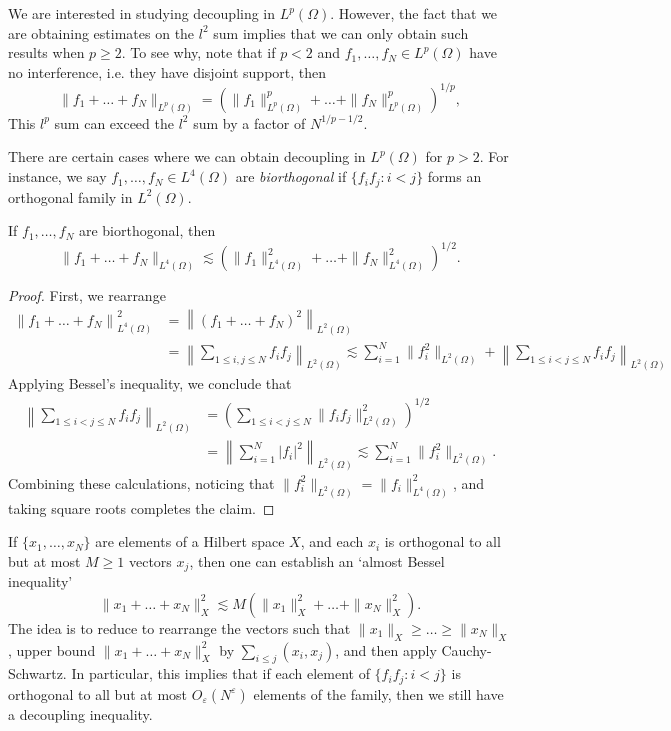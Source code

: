 \begin{remark}
  We are interested in studying decoupling in $L^p(\Omega)$. However, the fact that we are obtaining estimates on the $l^2$ sum implies that we can only obtain such results when $p \geq 2$. To see why, note that if $p < 2$ and $f_1, \dots, f_N \in L^p(\Omega)$ have no interference, i.e. they have disjoint support, then
  \[ \| f_1 + \dots + f_N \|_{L^p(\Omega)} = \left( \| f_1 \|_{L^p(\Omega)}^p + \dots + \| f_N \|_{L^p(\Omega)}^p  \right)^{1/p}, \]
  This $l^p$ sum can exceed the $l^2$ sum by a factor of $N^{1/p - 1/2}$.
\end{remark}

There are certain cases where we can obtain decoupling in $L^p(\Omega)$ for $p > 2$. For instance, we say $f_1, \dots, f_N \in L^4(\Omega)$ are \emph{biorthogonal} if $\{ f_i f_j : i < j \}$ forms an orthogonal family in $L^2(\Omega)$.

\begin{theorem}
  If $f_1, \dots, f_N$ are biorthogonal, then
  \[ \| f_1 + \dots + f_N \|_{L^4(\Omega)} \lesssim \left( \| f_1 \|_{L^4(\Omega)}^2 + \dots + \| f_N \|_{L^4(\Omega)}^2 \right)^{1/2}. \]
\end{theorem}
\begin{proof}
  First, we rearrange
  \begin{align*}
    \left\| f_1 + \dots + f_N \right\|_{L^4(\Omega)}^2 &= \left\| (f_1 + \dots + f_N)^2 \right\|_{L^2(\Omega)}\\
    &= \left\| \sum_{1 \leq i,j \leq N} f_i f_j \right\|_{L^2(\Omega)} \lesssim \sum_{i = 1}^N \| f_i^2 \|_{L^2(\Omega)} + \left\| \sum_{1 \leq i < j \leq N} f_i f_j \right\|_{L^2(\Omega)}
  \end{align*}
  Applying Bessel's inequality, we conclude that
  \begin{align*}
    \left\| \sum_{1 \leq i < j \leq N} f_i f_j \right\|_{L^2(\Omega)} &= \left( \sum_{1 \leq i < j \leq N} \| f_i f_j \|_{L^2(\Omega)}^2 \right)^{1/2}\\
    &= \left\| \sum_{i = 1}^N |f_i|^2 \right\|_{L^2(\Omega)} \lesssim \sum_{i = 1}^N \| f_i^2 \|_{L^2(\Omega)}.
  \end{align*}
  Combining these calculations, noticing that $\| f_i^2 \|_{L^2(\Omega)} = \| f_i \|_{L^4(\Omega)}^2$, and taking square roots completes the claim.
\end{proof}

\begin{remark}
  If $\{ x_1, \dots, x_N \}$ are elements of a Hilbert space $X$, and each $x_i$ is orthogonal to all but at most $M \geq 1$ vectors $x_j$, then one can establish an `almost Bessel inequality'
  \[ \| x_1 + \dots + x_N \|_X^2 \lesssim M \left( \| x_1 \|_X^2 + \dots + \| x_N \|_X^2 \right). \]
  The idea is to reduce to rearrange the vectors such that $\| x_1 \|_X \geq \dots \geq \| x_N \|_X$, upper bound $\| x_1 + \dots + x_N \|_X^2$ by $\sum_{i \leq j} (x_i,x_j)$, and then apply Cauchy-Schwartz. In particular, this implies that if each element of $\{ f_i f_j : i < j \}$ is orthogonal to all but at most $O_\varepsilon(N^\varepsilon)$ elements of the family, then we still have a decoupling inequality.
\end{remark}

